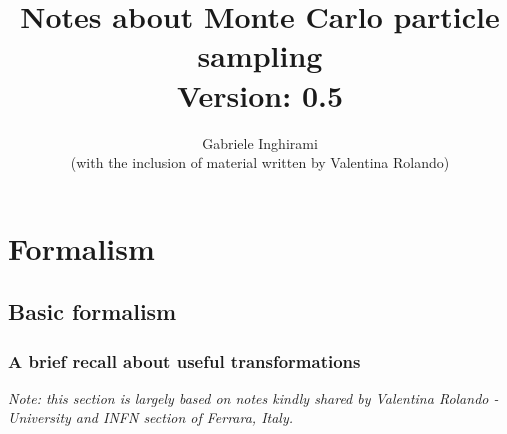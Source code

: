 \documentclass[12pt, a4paper]{report}
\begin{document}
	\title{Notes about Monte Carlo particle sampling\\\vspace*{1cm}\small{Version: 0.5}}
\author{Gabriele Inghirami\\\footnotesize{(with the inclusion of material written by Valentina Rolando)}}
\maketitle
\tableofcontents

\part{Formalism}
\chapter{Basic formalism}
\section{A brief recall about useful transformations}
\emph{Note: this section is largely based on notes kindly shared by Valentina Rolando - University and INFN section of Ferrara, Italy.}\\
\end{document}
